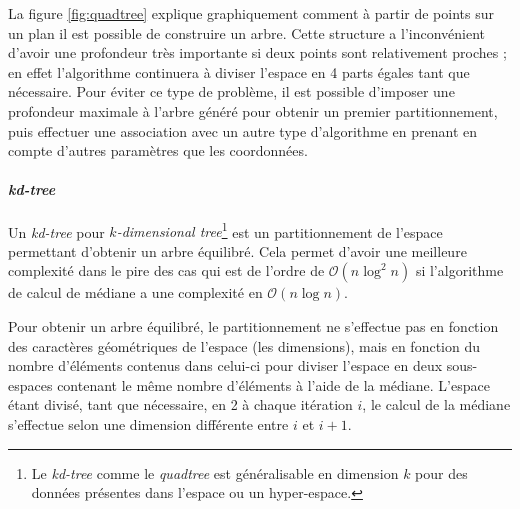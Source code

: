 La figure \ref{fig:quadtree} explique graphiquement comment à partir de points sur un plan il est possible de construire un arbre. Cette structure a l'inconvénient d'avoir une profondeur très importante si deux points sont relativement proches ; en effet l'algorithme continuera à diviser l'espace en 4 parts égales tant que nécessaire. Pour éviter ce type de problème, il est possible d'imposer une profondeur maximale à l'arbre généré pour obtenir un premier partitionnement, puis effectuer une association avec un autre type d'algorithme en prenant en compte d'autres paramètres que les coordonnées.

				\paragraph{\emph{kd-tree}}
Un \emph{kd-tree} pour \emph{$k$-dimensional tree}\footnote{Le \emph{kd-tree} comme le \emph{quadtree} est généralisable en dimension $k$ pour des données présentes dans l'espace ou un hyper-espace.} est un partitionnement de l'espace permettant d'obtenir un arbre équilibré. Cela permet d'avoir une meilleure complexité dans le pire des cas qui est de l'ordre de $\mathcal{O}(n \log^2 n)$ si l'algorithme de calcul de médiane a une complexité en $\mathcal{O}(n\log n)$.

Pour obtenir un arbre équilibré, le partitionnement ne s'effectue pas en fonction des caractères géométriques de l'espace (les dimensions), mais en fonction du nombre d'éléments contenus dans celui-ci pour diviser l'espace en deux sous-espaces contenant le même nombre d'éléments à l'aide de la médiane. L'espace étant divisé, tant que nécessaire, en 2 à chaque itération $i$, le calcul de la médiane s'effectue selon une dimension différente entre $i$ et $i+1$.


